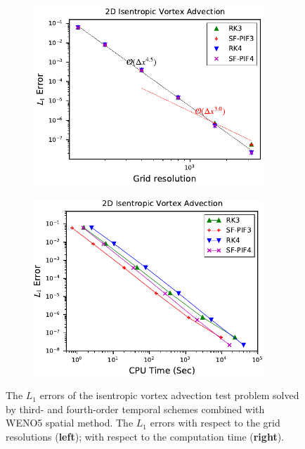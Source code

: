 \begin{figure}
    \centering
    \begin{subfigure}{70mm}
        \centering
        \includegraphics[width=0.95\textwidth]{fig/weno5_vortex_error_fourth}
    \end{subfigure}
    \begin{subfigure}{70mm}
        \centering
        \includegraphics[width=0.95\textwidth]{fig/weno5_vortex_time_fourth}
    \end{subfigure}
    \caption{The \( L_{1} \) errors of the isentropic vortex advection test problem
        solved by third- and fourth-order temporal schemes combined with WENO5 spatial method.
        The \( L_{1} \) errors
        with respect to the grid resolutions (\textbf{left});
        with respect to the computation time (\textbf{right}).
    }\label{fig:vortex_fourth}
\end{figure}

